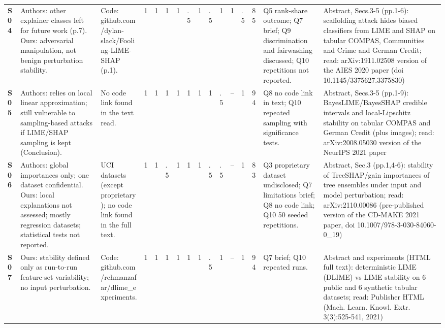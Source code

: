 \begin{longtable}{@{}P{1.0cm}P{4.6cm}P{3.6cm}P{0.3cm}P{0.3cm}P{0.3cm}P{0.3cm}P{0.3cm}P{0.3cm}P{0.3cm}P{0.3cm}P{0.3cm}P{0.36cm}P{0.75cm}P{3.0cm}P{3.9cm}@{}}
\textbf{S04} & Authors: other explainer classes left for future work (p.7). Ours: adversarial manipulation, not benign perturbation stability. & Code: github.com/\allowbreak{}dylan-slack/\allowbreak{}Fooling-LIME-SHAP (p.1). & 1 & 1 & 1 & 1 & .5 & 1 & .5 & 1 & 1 & .5 & 85 & Q5 rank-share outcome; Q7 brief; Q9 discrimination and fairwashing discussed; Q10 repetitions not reported. & Abstract, Secs.3-5 (pp.1-6): scaffolding attack hides biased classifiers from LIME and SHAP on tabular COMPAS, Communities and Crime and German Credit; read: arXiv:1911.02508 version of the AIES 2020 paper (doi 10.1145/\allowbreak{}3375627.3375830) \\
\textbf{S05} & Authors: relies on local linear approximation; still vulnerable to sampling-based attacks if LIME/\allowbreak{}SHAP sampling is kept (Conclusion). & No code link found in the text read. & 1 & 1 & 1 & 1 & 1 & 1 & 1 & .5 & -- & 1 & 94 & Q8 no code link in text; Q10 repeated sampling with significance tests. & Abstract, Secs.3-5 (pp.1-9): BayesLIME/\allowbreak{}BayesSHAP credible intervals and local-Lipschitz stability on tabular COMPAS and German Credit (plus images); read: arXiv:2008.05030 version of the NeurIPS 2021 paper \\
\textbf{S06} & Authors: global importances only; one dataset confidential. Ours: local explanations not assessed; mostly regression datasets; statistical tests not reported. & UCI datasets (except proprietary); no code link found in the full text. & 1 & 1 & .5 & 1 & 1 & 1 & .5 & .5 & -- & 1 & 83 & Q3 proprietary dataset undisclosed; Q7 limitations brief; Q8 no code link; Q10 50 seeded repetitions. & Abstract, Sec.3 (pp.1,4-6): stability of TreeSHAP/\allowbreak{}gain importances of tree ensembles under input and model perturbation; read: arXiv:2110.00086 (pre-published version of the CD-MAKE 2021 paper, doi 10.1007/\allowbreak{}978-3-030-84060-0\_\allowbreak{}19) \\
\textbf{S07} & Ours: stability defined only as run-to-run feature-set variability; no input perturbation. & Code: github.com/\allowbreak{}rehmanzafar/\allowbreak{}dlime\_\allowbreak{}experiments. & 1 & 1 & 1 & 1 & 1 & 1 & .5 & 1 & -- & 1 & 94 & Q7 brief; Q10 repeated runs. & Abstract and experiments (HTML full text): deterministic LIME (DLIME) vs LIME stability on 6 public and 6 synthetic tabular datasets; read: Publisher HTML (Mach. Learn. Knowl. Extr. 3(3):525-541, 2021) \\

\end{longtable}
